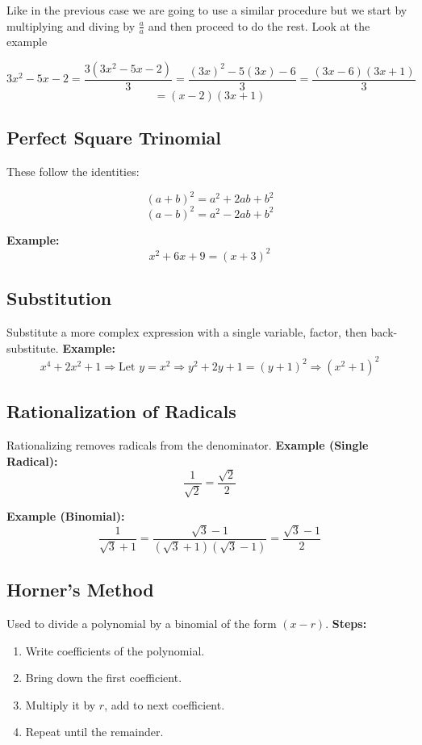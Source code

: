Like in the previous case we are going to use a similar procedure but we start by
multiplying and diving by \(\frac{a}{a}\) and then proceed to do the rest. Look at the example

\[
3x^2 -5x - 2 = \frac{3(3x^2 -5x - 2)}{3} = \frac{{(3x)}^2 -5(3x) - 6}{3} = \frac{(3x- 6)(3x+1)}{3} 
\]
\[
= (x- 2)(3x +1)
\]

\subsection{Perfect Square Trinomial}

These follow the identities:

\[
{(a + b)}^2 = a^2 + 2ab + b^2
\]
\[
{(a - b)}^2 = a^2 - 2ab + b^2
\]

\textbf{Example:}
\[
x^2 + 6x + 9 = {(x + 3)}^2
\]

\subsection{Substitution}

Substitute a more complex expression with a single variable, factor, then back-substitute.
\newline
\textbf{Example:}
\[
x^4 + 2x^2 + 1 \Rightarrow \text{Let } y = x^2 \Rightarrow y^2 + 2y + 1 = {(y + 1)}^2 \Rightarrow {(x^2 + 1)}^2
\]

\subsection{Rationalization of Radicals}

Rationalizing removes radicals from the denominator.
\newline
\textbf{Example (Single Radical):}
\[
\frac{1}{\sqrt{2}} = \frac{\sqrt{2}}{2}
\]

\textbf{Example (Binomial):}
\[
\frac{1}{\sqrt{3} + 1} = \frac{\sqrt{3} - 1}{(\sqrt{3} + 1)(\sqrt{3} - 1)} = \frac{\sqrt{3} - 1}{2}
\]

\subsection{Horner’s Method}

Used to divide a polynomial by a binomial of the form \((x - r)\).
\newline
\textbf{Steps:}
\begin{enumerate}
    \item Write coefficients of the polynomial.
    \item Bring down the first coefficient.
    \item Multiply it by \(r\), add to next coefficient.
    \item Repeat until the remainder.
\end{enumerate}

